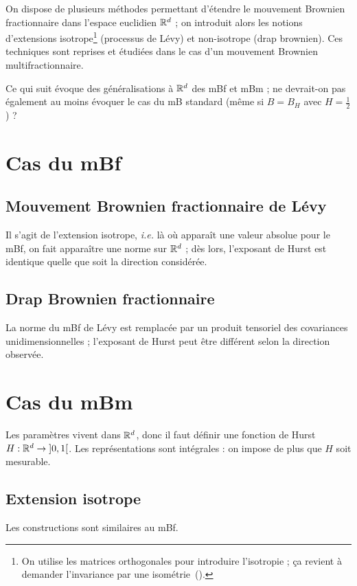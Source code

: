 \label{chp:extensions}

On dispose de plusieurs méthodes permettant d'étendre le mouvement
Brownien fractionnaire dans l'espace euclidien $\mathbb{R}^d$ ; on introduit
alors les notions d'extensions isotrope\footnote{On utilise les
  matrices orthogonales pour introduire l'isotropie ; ça revient à
  demander l'invariance par une isométrie~(\cite{ayache2018}).}
(processus de Lévy) et non-isotrope (drap brownien). Ces techniques
sont reprises et étudiées dans le cas d'un mouvement Brownien
multifractionnaire.

\begin{question}
  Ce qui suit évoque des généralisations à $\mathbb{R}^d$ des mBf et mBm ; ne
  devrait-on pas également au moins évoquer le cas du mB standard
  (même si $B = B_H$ avec $H=\frac{1}{2}$) ?
\end{question}

\section{Cas du mBf}
\subsection{Mouvement Brownien fractionnaire de Lévy}
Il s'agit de l'extension isotrope, \emph{i.e.} là où apparaît une
valeur absolue pour le mBf, on fait apparaître une norme sur $\mathbb{R}^d$ ;
dès lors, l'exposant de Hurst est identique quelle que soit la
direction considérée.

\subsection{Drap Brownien fractionnaire}
La norme du mBf de Lévy est remplacée par un produit tensoriel des
covariances unidimensionnelles ; l'exposant de Hurst peut être
différent selon la direction observée.

\section{Cas du mBm}
Les paramètres vivent dans $\mathbb{R}^d$, donc il faut définir une fonction
de Hurst $H:\mathbb{R}^d \to \left]0,1\right[$. Les représentations sont intégrales
: on impose de plus que $H$ soit mesurable.
\subsection{Extension isotrope}
Les constructions sont similaires au mBf.
